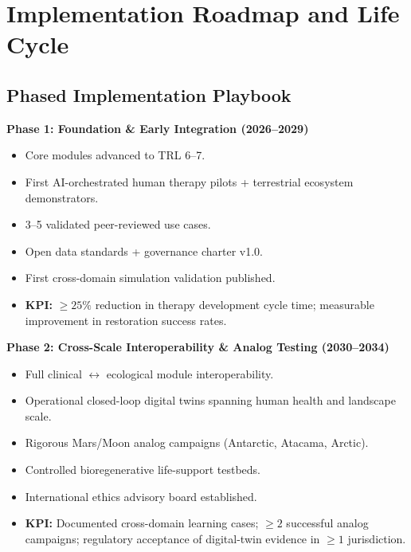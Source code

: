 \documentclass[11pt,a4paper]{report}
\begin{document}
\chapter{Implementation Roadmap and Life Cycle}

\section{Phased Implementation Playbook}

\textbf{Phase 1: Foundation \& Early Integration (2026--2029)}
\begin{itemize}
    \item Core modules advanced to TRL 6--7.
    \item First AI-orchestrated human therapy pilots + terrestrial ecosystem demonstrators.
    \item 3--5 validated peer-reviewed use cases.
    \item Open data standards + governance charter v1.0.
    \item First cross-domain simulation validation published.
    \item \textbf{KPI:} $\geq 25\%$ reduction in therapy development cycle time; measurable improvement in restoration success rates.
\end{itemize}

\textbf{Phase 2: Cross-Scale Interoperability \& Analog Testing (2030--2034)}
\begin{itemize}
    \item Full clinical $\leftrightarrow$ ecological module interoperability.
    \item Operational closed-loop digital twins spanning human health and landscape scale.
    \item Rigorous Mars/Moon analog campaigns (Antarctic, Atacama, Arctic).
    \item Controlled bioregenerative life-support testbeds.
    \item International ethics advisory board established.
    \item \textbf{KPI:} Documented cross-domain learning cases; $\geq 2$ successful analog campaigns; regulatory acceptance of digital-twin evidence in $\geq 1$ jurisdiction.
\end{itemize}
\end{document}
